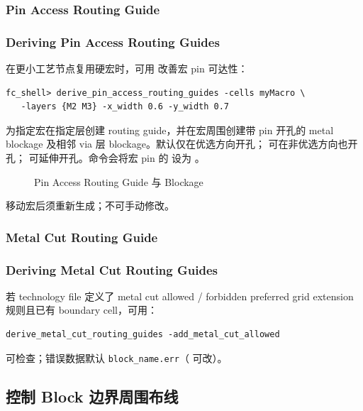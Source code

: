 \subsubsection{Pin Access Routing Guide}
\subsubsection*{Deriving Pin Access Routing Guides}

在更小工艺节点复用硬宏时，可用  改善宏 pin 可达性：

\begin{lstlisting}
fc_shell> derive_pin_access_routing_guides -cells myMacro \
   -layers {M2 M3} -x_width 0.6 -y_width 0.7
\end{lstlisting}

为指定宏在指定层创建 routing guide，并在宏周围创建带 pin 开孔的 metal blockage 及相邻 via 层 blockage。默认仅在优选方向开孔； 可在非优选方向也开孔； 可延伸开孔。命令会将宏 pin 的  设为 。

\begin{figure}[htbp]
\centering
{}
\caption{Pin Access Routing Guide 与 Blockage}
\label{fig:pin-access-guides}
\end{figure}

移动宏后须重新生成；不可手动修改。

\subsubsection{Metal Cut Routing Guide}
\subsubsection*{Deriving Metal Cut Routing Guides}

若 technology file 定义了 metal cut allowed / forbidden preferred grid extension 规则且已有 boundary cell，可用：
\begin{lstlisting}
derive_metal_cut_routing_guides -add_metal_cut_allowed
\end{lstlisting}
 可检查；错误数据默认 \texttt{block\_name.err}（ 可改）。

\subsection{控制 Block 边界周围布线}
